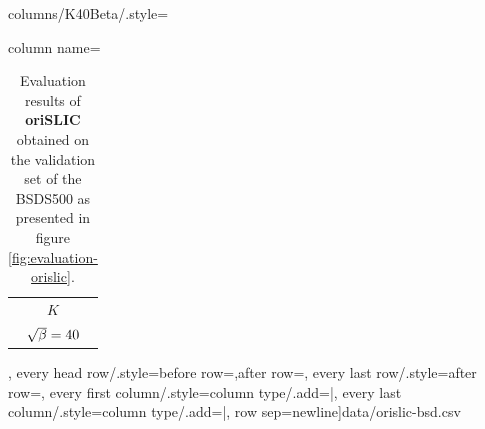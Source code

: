 \begin{table}[H]
		columns/K40Beta/.style={column name=\begin{tabular}{c}$K$\\$\sqrt{\beta}= 40$\end{tabular}},%
		every head row/.style={before row=\hline,after row=\hline\hline},%
		every last row/.style={after row=\hline},%
		every first column/.style={column type/.add={|}{}},%
		every last column/.style={column type/.add={}{|}},%
		row sep=newline]{data/orislic-bsd.csv}
	\caption[Evaluation results of the original implementation of \textbf{SLIC} \cite{AchantaShajiSmithLucchiFuaSuesstrunk:2010} obtained on the validation set of the Berkeley Segmentation Dataset \cite{ArbelaezMaireFowlkesMalik:2011}.]{Evaluation results of \textbf{oriSLIC} \cite{AchantaShajiSmithLucchiFuaSuesstrunk:2010} obtained on the validation set of the BSDS500 as presented in figure \ref{fig:evaluation-orislic}.}
\end{table}
